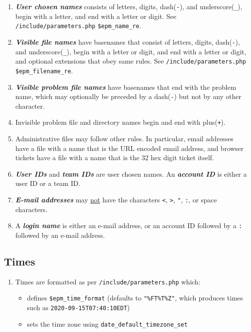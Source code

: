 \documentclass[12pt]{article}
\newcommand{\key}[1]{{\bf \em #1}}
\newcommand{\EOL}{\penalty \exhyphenpenalty}
\begin{document}
\begin{enumerate}
\item \key{User chosen names}\label{USER-CHOSEN-NAME}
consists of letters, digits,
dash({\tt -}), and underscore({\tt \_}), begin with a letter,
and end with a letter or digit.
See {\tt /include/parameters.php} {\tt \$epm\_name\_re}.
\item \key{Visible file names} have basenames that
consist of letters, digits, dash({\tt -}), and
underscore({\tt \_}), begin with a letter or digit, and end
with a letter or digit, and optional extensions that obey
same rules.  See {\tt /include/parameters.php} {\tt \$epm\_filename\_re}.
\item \key{Visible problem file names} have basenames that end with the
      problem name, which may optionally be preceded by a dash({\tt -}) but
      not by any other character.
\item Invisible problem
      file and directory names begin and end with plus({\tt +}).
\item Administrative files may follow other rules.  In particular,
      email addresses have a file with a name that is the URL encoded email
      address, and browser tickets have a file with a name that is the
      32 hex digit ticket itself.
\item \key{User IDs} and \key{team IDs}\label{AIDS} are user chosen names.
      An \key{account ID} is either a user ID or a team ID.
\item \key{E-mail addresses} may \underline{not} have the
      characters {\tt <}, {\tt >}, {\tt "}, {\tt :}, or space
      characters.
\item A \key{login name} is either an e-mail address, or an
      account ID followed by a {\tt :} followed by an e-mail address.
\end{enumerate}

\subsection{Times}

\begin{enumerate}
\item Times are formatted as per {\tt /include/parameters.php}
     which:
     \begin{itemize}
     \item defines {\tt \$epm\_time\_\EOL format}
           (defaults to {\tt "\%FT\%T\%Z"}, which
	    produces times such as {\tt 2020-09-15T07:40:10EDT})
     \item sets the time zone using
           {\tt date\_default\_\EOL timezone\_\EOL set}
     \end{itemize}

\end{enumerate}
\end{document}
